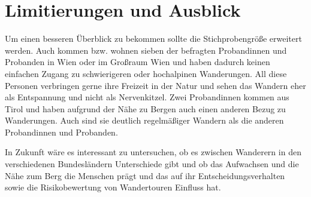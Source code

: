 \section{Limitierungen und Ausblick}

Um einen besseren Überblick zu bekommen sollte die Stichprobengröße erweitert werden. Auch kommen bzw. wohnen sieben der befragten Probandinnen und Probanden in Wien oder im Großraum Wien und haben dadurch keinen einfachen Zugang zu schwierigeren oder hochalpinen Wanderungen. All diese Personen verbringen gerne ihre Freizeit in der Natur und sehen das Wandern eher als Entspannung und nicht als Nervenkitzel. Zwei Probandinnen kommen aus Tirol und haben aufgrund der Nähe zu Bergen auch einen anderen Bezug zu Wanderungen. Auch sind sie deutlich regelmäßiger Wandern als die anderen Probandinnen und Probanden.

In Zukunft wäre es interessant zu untersuchen, ob es zwischen Wanderern in den verschiedenen Bundesländern Unterschiede gibt und ob das Aufwachsen und die Nähe zum Berg die Menschen prägt und das auf ihr Entscheidungsverhalten sowie die Risikobewertung von Wandertouren Einfluss hat.









